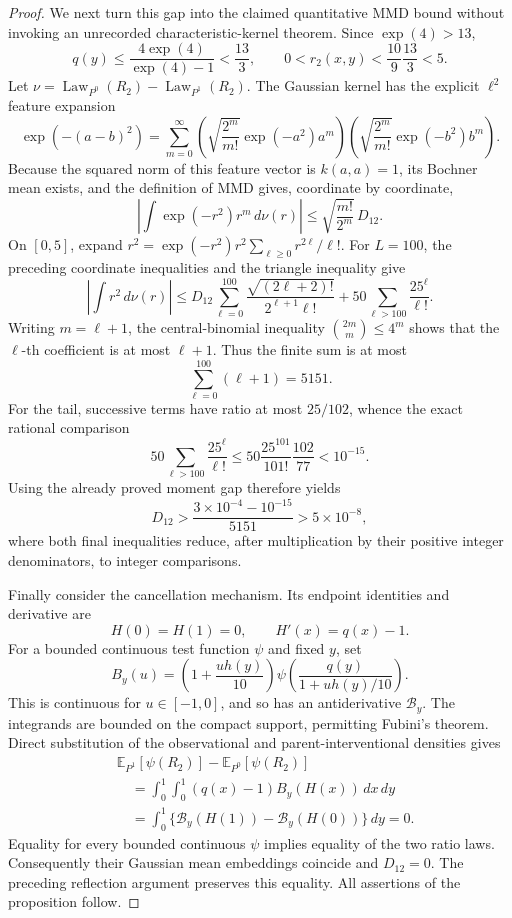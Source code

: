 \documentclass{article}
\begin{document}
\begin{proof}
We next turn this gap into the claimed quantitative MMD bound without invoking an unrecorded characteristic-kernel theorem.  Since \(\exp(4)>13\),
\[
 q(y)\leq\frac{4\exp(4)}{\exp(4)-1}<\frac{13}{3},
 \qquad
 0<r_2(x,y)<\frac{10}{9}\frac{13}{3}<5.
\]
Let \(\nu=\operatorname{Law}_{P^0}(R_2)-\operatorname{Law}_{P^1}(R_2)\).  The Gaussian kernel has the explicit \(\ell^2\) feature expansion
\[
 \exp(-(a-b)^2)
 =\sum_{m=0}^{\infty}
 \left(\sqrt{\frac{2^m}{m!}}\exp(-a^2)a^m\right)
 \left(\sqrt{\frac{2^m}{m!}}\exp(-b^2)b^m\right).
\]
Because the squared norm of this feature vector is \(k(a,a)=1\), its Bochner mean exists, and the definition of MMD gives, coordinate by coordinate,
\[
 \left|\int \exp(-r^2)r^m\,d\nu(r)\right|
 \leq\sqrt{\frac{m!}{2^m}}\,D_{12}.
\]
On \([0,5]\), expand \(r^2=\exp(-r^2)r^2\sum_{\ell\geq0}r^{2\ell}/\ell!\).  For \(L=100\), the preceding coordinate inequalities and the triangle inequality give
\[
 \left|\int r^2\,d\nu(r)\right|
 \leq D_{12}\sum_{\ell=0}^{100}
       \frac{\sqrt{(2\ell+2)!}}{2^{\ell+1}\ell!}
   +50\sum_{\ell>100}\frac{25^\ell}{\ell!}.
\]
Writing \(m=\ell+1\), the central-binomial inequality
\(\binom{2m}{m}\leq4^m\) shows that the \(\ell\)-th coefficient is at most \(\ell+1\).  Thus the finite sum is at most
\[
 \sum_{\ell=0}^{100}(\ell+1)=5151.
\]
For the tail, successive terms have ratio at most \(25/102\), whence the exact rational comparison
\[
 50\sum_{\ell>100}\frac{25^\ell}{\ell!}
 \leq 50\frac{25^{101}}{101!}\frac{102}{77}<10^{-15}.
\]
Using the already proved moment gap therefore yields
\[
 D_{12}>\frac{3\times10^{-4}-10^{-15}}{5151}>5\times10^{-8},
\]
where both final inequalities reduce, after multiplication by their positive integer denominators, to integer comparisons.

Finally consider the cancellation mechanism.  Its endpoint identities and derivative are
\[
 H(0)=H(1)=0,
 \qquad
 H'(x)=q(x)-1.
\]
For a bounded continuous test function \(\psi\) and fixed \(y\), set
\[
 B_y(u)=\left(1+\frac{u h(y)}{10}\right)
 \psi\!\left(\frac{q(y)}{1+u h(y)/10}\right).
\]
This is continuous for \(u\in[-1,0]\), and so has an antiderivative \(\mathcal B_y\).  The integrands are bounded on the compact support, permitting Fubini's theorem.  Direct substitution of the observational and parent-interventional densities gives
\[
 \begin{aligned}
 &\mathbb E_{P^1}[\psi(R_2)]-\mathbb E_{P^0}[\psi(R_2)]\\
 &\quad=\int_0^1\!\int_0^1
       (q(x)-1)B_y(H(x))\,dx\,dy\\
 &\quad=\int_0^1
       \bigl\{\mathcal B_y(H(1))-\mathcal B_y(H(0))\bigr\}\,dy=0.
 \end{aligned}
\]
Equality for every bounded continuous \(\psi\) implies equality of the two ratio laws.  Consequently their Gaussian mean embeddings coincide and \(D_{12}=0\).  The preceding reflection argument preserves this equality.  All assertions of the proposition follow.
\end{proof}
\end{document}
